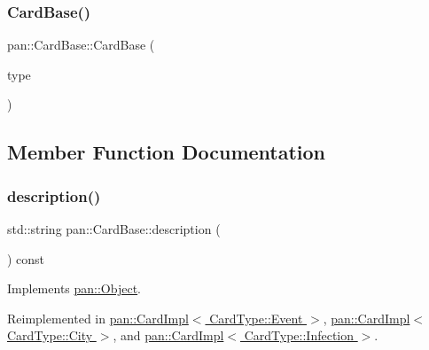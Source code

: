\mbox{\label{classpan_1_1_card_base_afdca48b95924340316fd8a0a0a784330}} 
\subsubsection{\texorpdfstring{Card\+Base()}{CardBase()}}
{\footnotesize\ttfamily pan\+::\+Card\+Base\+::\+Card\+Base (\begin{DoxyParamCaption}\item[{\hyperlink{namespacepan_a1f7350bfd0421afeabe9fa95c16fa811}{Card\+Type}}]{type }\end{DoxyParamCaption})}



\subsection{Member Function Documentation}
\mbox{\label{classpan_1_1_card_base_ad004c502404a958eaf4ecae7e73cc8cf}} 
\subsubsection{\texorpdfstring{description()}{description()}}
{\footnotesize\ttfamily std\+::string pan\+::\+Card\+Base\+::description (\begin{DoxyParamCaption}{ }\end{DoxyParamCaption}) const\hspace{0.3cm}{\ttfamily [virtual]}}



Implements \hyperlink{classpan_1_1_object_a2bb6d3117bb32f5774657c83f118ed8b}{pan\+::\+Object}.



Reimplemented in \hyperlink{classpan_1_1_card_impl_3_01_card_type_1_1_event_01_4_aa5c7d2729e0bfb141a0d8487a590a580}{pan\+::\+Card\+Impl$<$ Card\+Type\+::\+Event $>$}, \hyperlink{classpan_1_1_card_impl_3_01_card_type_1_1_city_01_4_a326c3eaac225bd758f19abb152deffe4}{pan\+::\+Card\+Impl$<$ Card\+Type\+::\+City $>$}, and \hyperlink{classpan_1_1_card_impl_3_01_card_type_1_1_infection_01_4_a5e31904120b655ce59633433a4d4c17c}{pan\+::\+Card\+Impl$<$ Card\+Type\+::\+Infection $>$}.

